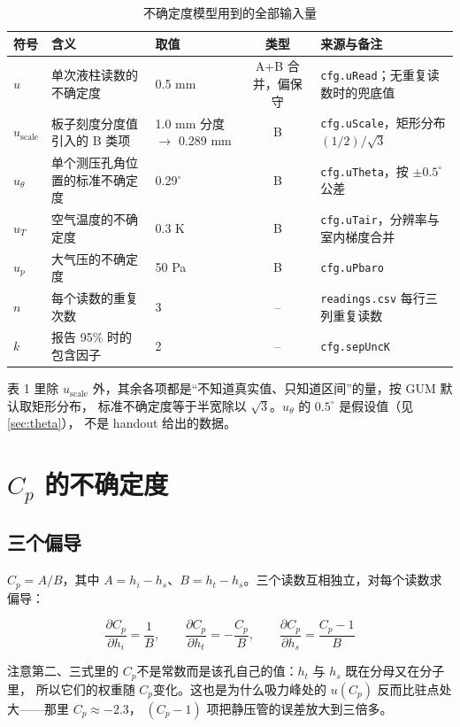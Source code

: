 \documentclass[11pt,a4paper]{ctexart}
\newcommand{\Cp}{\ensuremath{C_p}}
\begin{document}
\begin{table}[H]
\centering
\caption{不确定度模型用到的全部输入量}
\small
\begin{tabularx}{\textwidth}{@{}l p{3.9cm} p{2.5cm} c X@{}}
\toprule
符号 & 含义 & 取值 & 类型 & 来源与备注 \\
\midrule
$u$ & 单次液柱读数的不确定度 & 0.5 mm & A+B 合并，偏保守 & \texttt{cfg.uRead}；无重复读数时的兜底值 \\
$u_{\text{scale}}$ & 板子刻度分度值引入的 B 类项 & 1.0 mm 分度 $\to$ 0.289 mm & B & \texttt{cfg.uScale}，矩形分布 $(1/2)/\sqrt{3}$ \\
$u_\theta$ & 单个测压孔角位置的标准不确定度 & 0.29$^\circ$ & B & \texttt{cfg.uTheta}，按 $\pm0.5^\circ$ 公差 \\
$u_{T}$ & 空气温度的不确定度 & 0.3 K & B & \texttt{cfg.uTair}，分辨率与室内梯度合并 \\
$u_{p}$ & 大气压的不确定度 & 50 Pa & B & \texttt{cfg.uPbaro} \\
$n$ & 每个读数的重复次数 & 3 & -- & \texttt{readings.csv} 每行三列重复读数 \\
$k$ & 报告 95\% 时的包含因子 & 2 & -- & \texttt{cfg.sepUncK} \\
\bottomrule
\end{tabularx}
\end{table}

表 1 里除 $u_{\text{scale}}$ 外，其余各项都是“不知道真实值、只知道区间”的量，按 GUM 默认取矩形分布，
标准不确定度等于半宽除以 $\sqrt{3}$。$u_\theta$ 的 $0.5^\circ$ 是假设值（见 \ref{sec:theta}），
不是 handout 给出的数据。

\section{\Cp{} 的不确定度}

\subsection{三个偏导}

$\Cp = A/B$，其中 $A = h_i - h_s$、$B = h_t - h_s$。三个读数互相独立，对每个读数求偏导：

\begin{equation}
\frac{\partial \Cp}{\partial h_i} = \frac{1}{B}, \qquad
\frac{\partial \Cp}{\partial h_t} = -\frac{\Cp}{B}, \qquad
\frac{\partial \Cp}{\partial h_s} = \frac{\Cp - 1}{B}
\end{equation}

注意第二、三式里的 \Cp 不是常数而是该孔自己的值：$h_t$ 与 $h_s$ 既在分母又在分子里，
所以它们的权重随 \Cp 变化。这也是为什么吸力峰处的 $u(\Cp)$ 反而比驻点处大——那里 $\Cp \approx -2.3$，
$(\Cp - 1)$ 项把静压管的误差放大到三倍多。
\end{document}
